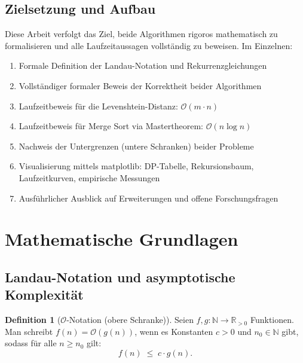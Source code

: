 ﻿\documentclass[a4paper,12pt]{article}
\theoremstyle{definition}
\newtheorem{definition}{Definition}
\begin{document}
\subsection{Zielsetzung und Aufbau}

Diese Arbeit verfolgt das Ziel, beide Algorithmen rigoros mathematisch zu
formalisieren und alle Laufzeitaussagen vollständig zu beweisen. Im Einzelnen:
\begin{enumerate}
    \item Formale Definition der Landau-Notation und Rekurrenzgleichungen
    \item Vollständiger formaler Beweis der Korrektheit beider Algorithmen
    \item Laufzeitbeweis für die Levenshtein-Distanz: $\mathcal{O}(m \cdot n)$
    \item Laufzeitbeweis für Merge Sort via Mastertheorem: $\mathcal{O}(n \log n)$
    \item Nachweis der Untergrenzen (untere Schranken) beider Probleme
    \item Visualisierung mittels matplotlib: DP-Tabelle, Rekursionsbaum,
          Laufzeitkurven, empirische Messungen
    \item Ausführlicher Ausblick auf Erweiterungen und offene Forschungsfragen
\end{enumerate}

\section{Mathematische Grundlagen}

\subsection{Landau-Notation und asymptotische Komplexität}

\begin{definition}[$\mathcal{O}$-Notation (obere Schranke)]
    Seien $f, g: \mathbb{N} \to \mathbb{R}_{>0}$ Funktionen. Man schreibt
    $f(n) = \mathcal{O}(g(n))$, wenn es Konstanten $c > 0$ und $n_0 \in \mathbb{N}$
    gibt, sodass für alle $n \geq n_0$ gilt:
    \[
        f(n) \;\leq\; c \cdot g(n).
    \]
\end{definition}
\end{document}
